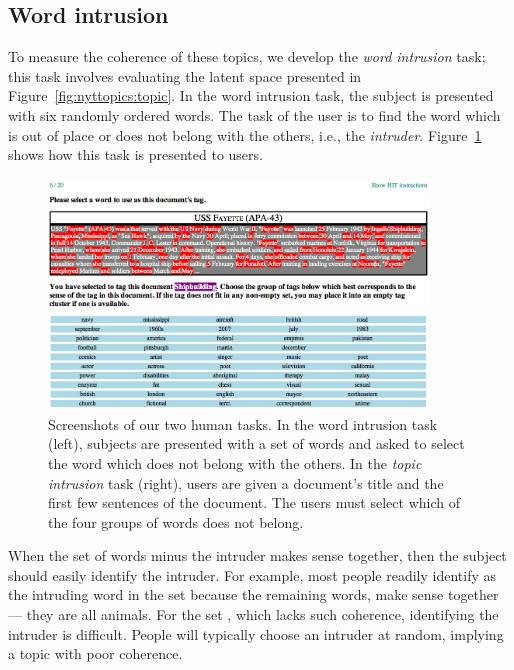 \subsection{Word intrusion}
\label{sec:wordintrusion}
To measure the coherence of these topics, we develop the \emph{word
intrusion} task; this task involves evaluating the latent space
presented in Figure~\ref{fig:nyttopics:topic}.  In the word intrusion
task, the subject is presented with six randomly ordered words.  The
task of the user is to find the word which is out of place or does not
belong with the others, i.e., the \emph{intruder}.
Figure~\ref{fig:intruding_word} shows how this task is presented to
users.

\begin{figure}[t]
\centering

\includegraphics[width=0.90\textwidth]{figures/screenshots.png}

\caption{Screenshots of our two human tasks. In the word intrusion
  task (left), subjects are presented with a set of words and asked to
  select the word which does not belong with the others.  In the
  \emph{topic intrusion} task (right), users are given a document's
  title and the first few sentences of the document.  The users must
  select which of the four groups of words does not belong.}
\label{fig:intruding_word}
\end{figure}

When the set of words minus the intruder makes sense together, then
the subject should easily identify the intruder.  For example, most
people readily identify  as the intruding word in the set
 because the remaining
words,  make sense together ---
they are all animals.  For the set , which lacks such coherence, identifying
the intruder is difficult.  People will typically choose an
intruder at random, implying a topic with poor coherence.

